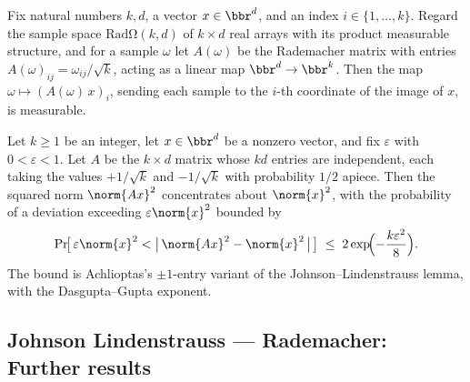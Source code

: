\begin{lemma}
\label{radMatrix_proj_meas}
\leanok
{}
Fix natural numbers $k, d$, a vector $x \in \bbr^d$, and an index $i \in \{1, \dots,
k\}$. Regard the sample space $\mathrm{Rad\Omega}(k,d)$ of $k \times d$ real arrays with
its product measurable structure, and for a sample $\omega$ let $A(\omega)$ be the
Rademacher matrix with entries $A(\omega)_{ij} = \omega_{ij}/\sqrt{k}$, acting as a
linear map $\bbr^d \to \bbr^k$. Then the map $\omega \mapsto (A(\omega)\,x)_i$, sending
each sample to the $i$-th coordinate of the image of $x$, is measurable.
\end{lemma}

\begin{theorem}
\label{jl_concentration_single_rademacher}
\leanok
{}
Let $k \ge 1$ be an integer, let $x \in \bbr^d$ be a nonzero vector, and fix
$\varepsilon$ with $0 < \varepsilon < 1$. Let $A$ be the $k \times d$ matrix whose $kd$
entries are independent, each taking the values $+1/\sqrt{k}$ and $-1/\sqrt{k}$ with
probability $1/2$ apiece. Then the squared norm $\norm{Ax}^2$ concentrates about
$\norm{x}^2$, with the probability of a deviation exceeding $\varepsilon\norm{x}^2$
bounded by
\[
\Pr\!\bigl[\, \varepsilon\norm{x}^2 < \bigl|\,\norm{Ax}^2 - \norm{x}^2\,\bigr| \,\bigr]
  \;\le\; 2\exp\!\Bigl(-\frac{k\varepsilon^2}{8}\Bigr).
\]
The bound is Achlioptas's $\pm1$-entry variant of the Johnson–Lindenstrauss lemma, with
the Dasgupta–Gupta exponent.
\end{theorem}

\subsection*{Johnson Lindenstrauss --- Rademacher: Further results}

